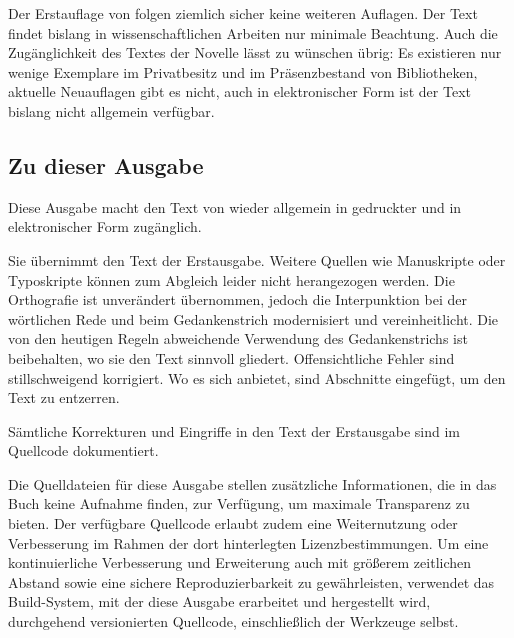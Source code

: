 \begin{small}
Der Erstauflage von \textit{\buchtitel{}} folgen ziemlich sicher
keine weiteren Auflagen. Der Text findet bislang in wissenschaftlichen
Arbeiten nur minimale Beachtung.%
Auch die Zugänglichkeit des Textes der Novelle lässt zu wünschen übrig:
Es existieren nur wenige Exemplare
im Privatbesitz und im Präsenzbestand von Bibliotheken, aktuelle Neuauflagen
gibt es nicht, auch in elektronischer Form ist der Text bislang nicht allgemein
verfügbar.

\subsection{Zu dieser Ausgabe}

\noindent{}Diese Ausgabe macht den Text von \textit{\buchtitel{}}
wieder allgemein in gedruckter und in elektronischer Form zugänglich.

Sie übernimmt den Text der Erstausgabe.
Weitere Quellen wie Manuskripte oder Typoskripte können
zum Abgleich leider nicht herangezogen werden. Die Orthografie
ist unverändert übernommen, jedoch die Interpunk­tion bei der
wörtlichen Rede und beim Gedankenstrich modernisiert und vereinheitlicht.
Die von den heutigen Regeln abweichende Verwendung des Gedankenstrichs
ist beibehalten, wo sie den Text sinnvoll gliedert.
Offensichtliche Fehler sind stillschweigend korrigiert.
Wo es sich anbietet, sind Abschnitte eingefügt, um den Text
zu entzerren. 

Sämtliche Korrekturen und Eingriffe in den Text der Erstausgabe sind
im Quellcode dokumentiert.%


Die Quelldateien für diese Ausgabe stellen zusätzliche Informationen,
die in das Buch keine Aufnahme finden, zur Verfügung, um maximale
Transparenz zu bieten.
Der verfügbare Quellcode erlaubt zudem eine Weiternutzung oder
Verbesserung im Rahmen der dort hinterlegten Lizenzbestimmungen.
Um eine kon\-tinuierliche Verbesserung und Erweiterung%
auch mit größerem zeitlichen Abstand sowie eine sichere Reproduzierbarkeit
zu gewährleisten, verwendet das Build-System, mit der diese Ausgabe erarbeitet und
hergestellt wird, durchgehend versionierten Quellcode,
einschließlich der Werkzeuge selbst.


\end{small}
